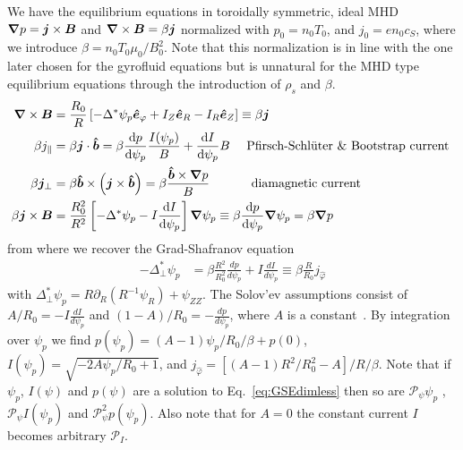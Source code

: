 We have the equilibrium equations in toroidally symmetric, ideal MHD
${\boldsymbol{\nabla}} p = {\boldsymbol{j}}\times {\boldsymbol{B}}$ and ${\boldsymbol{\nabla}}\times{\boldsymbol{B}} = \beta {\boldsymbol{j}}$ normalized with $p_0 = n_0 T_0$, and $j_0 = e n_0 c_S$, where we introduce $\beta = n_0 T_0 \mu_0 /B_0^2$.
Note that this normalization is in line with the one later chosen for the gyrofluid
equations but is unnatural for the MHD type equilibrium equations through the introduction
of $\rho_s$ and $\beta$.
\begin{align}
    {\boldsymbol{\nabla}}\times {\boldsymbol{B}} &= \frac{R_0}{R}\left[ -\Delta^*\psi_p\bm{\hat{e}}_\varphi + I_Z \bm{\hat{e}}_R - I_R\bm{\hat{e}}_Z \right]\equiv \beta {\boldsymbol{j}}\\
 \beta j_\parallel &= \beta {\boldsymbol{j}}\cdot \bm{\hat{b}} = \beta \frac{\mathrm{d} p}{\mathrm{d}\psi_p} \frac{I(\psi_p)}{B} +
 \frac{\mathrm{d} I}{\mathrm{d}\psi_p} B \quad \text{  Pfirsch-Schl\"uter \& Bootstrap current } \\
 \beta {\boldsymbol{j}}_\perp &= \beta \bm{\hat{b}}\times\left({\boldsymbol{j}}\times\bm{\hat{b}}\right)=
 \beta \frac{\bm{\hat{b}} \times {\boldsymbol{\nabla}} p}{B} \quad\quad\quad \text{ diamagnetic current} \\
 \beta {\boldsymbol{j}}\times{\boldsymbol{B}} &= \frac{R_0^2}{R^2}\left[ -\Delta^* \psi_p - I
     \frac{\mathrm{d} I}{\mathrm{d} \psi_p} \right]{\boldsymbol{\nabla}}\psi_p \equiv \beta \frac{\mathrm{d} p}{\mathrm{d}\psi_p}{\boldsymbol{\nabla}}\psi_p =\beta {\boldsymbol{\nabla}} p
\end{align}
from where we recover the Grad-Shafranov equation
\begin{align}\label{eq:GSEdimless}
    -\Delta^*_\perp  \psi_p &= \beta \frac{R^2}{R_0^2} \frac{d p}{d  \psi_p } + I \frac{d I}{d  \psi_p } \equiv \beta \frac{R}{R_0} j_{\hat\varphi}
\end{align}
with $\Delta^*_\perp \psi_p = R\partial_R (R^{-1}\psi_R) + \psi_{ZZ}$.
The Solov'ev assumptions consist of \(A/R_0 = -I \frac{d I}{d  \psi_p }\) and \((1-A)/R_0 = -\frac{d p}{d  \psi_p }\), where \(A\) is a constant~\cite{Cerfon2010,Cerfon2014}.
By integration over \(\psi_p\) we find
$
p(\psi_p) = (A-1)\psi_p/R_0/\beta + p(0)$, %
 $I(\psi_p) = \sqrt{-2 A \psi_p/R_0 + 1}$,
 and
    $j_{\hat\varphi} = \left[(A-1)R^2/R_0^2 - A \right]/R/\beta $.
Note that if $\psi_p$, $I(\psi)$ and $p(\psi)$ are a solution to Eq.~\eqref{eq:GSEdimless}
then so are $\mathcal P_\psi \psi_p$ , $\mathcal P_\psi I(\psi_p)$ and $\mathcal P_\psi^2 p(\psi_p)$.
Also note that for $A=0$ the constant current $I$ becomes arbitrary $\mathcal P_I$.

